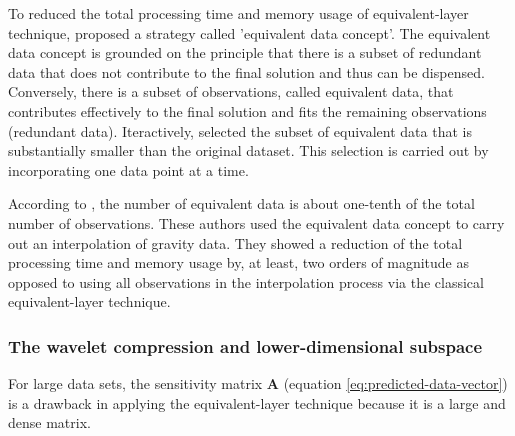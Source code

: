 To reduced the total processing time and memory usage of equivalent-layer technique, \cite{mendonca-silva1994} proposed a strategy called 'equivalent data concept'.
The equivalent data concept is grounded on the  principle  that there is a subset of redundant data that does not contribute to the final solution and thus can be dispensed.
Conversely, there is a subset of observations, called equivalent data, that  contributes effectively to the final solution and fits the remaining observations (redundant data).
Iteractively, \cite{mendonca-silva1994} selected the subset of equivalent data that is substantially smaller than the original dataset. 
This selection is carried out by incorporating one data point at a time.

According to \cite{mendonca-silva1994}, the number of equivalent data is about one-tenth 
of the total number of observations. 
These authors used the equivalent data concept to carry out an interpolation of gravity data.
They showed a reduction of the total processing time and memory usage by, at least, 
two orders of magnitude as opposed to using all observations in the interpolation process 
via the classical equivalent-layer technique.


\subsubsection{The wavelet compression and lower-dimensional subspace}

For large data sets, the  sensitivity matrix $\mathbf{A}$ (equation \ref{eq:predicted-data-vector}) is a drawback in applying  
the equivalent-layer technique because it is a large and dense matrix.

